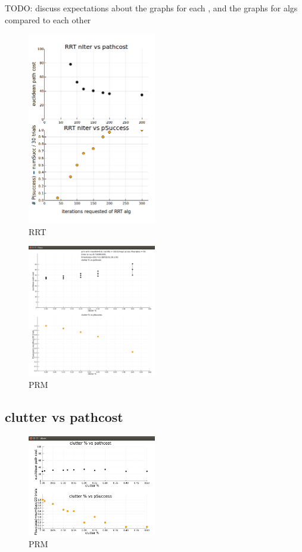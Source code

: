 \documentclass[a4paper]{article}
\begin{document}
TODO: discuss expectations about the graphs for each , and the graphs for algs
compared to each other 

\begin{figure} \centering
    \includegraphics[width=0.5\textwidth]{./RRT_n_pathcost_pSuccess.png}
     \caption{RRT} 
 \end{figure}

\begin{figure} \centering
    \includegraphics[width=0.5\textwidth]{./PRMn_vs_feasibility_errorbars.png}
     \caption{PRM} 
 \end{figure}

\subsection{ clutter vs pathcost }

\begin{figure} \centering
    \includegraphics[width=0.5\textwidth]{./PRMcostclutter.png}
     \caption{PRM} 
 \end{figure}
\end{document}
